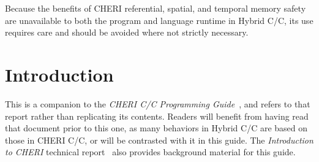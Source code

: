 \documentclass[12pt,twoside,openright,a4paper]{article}
\newcommand{\note}[2]{{\color{blue}[ Note: #1 - #2]}}
\renewcommand{\note}[2]{\relax\ifhmode\unskip\fi}
\newcommand{\rwnote}[1]{\note{#1}{Robert W.}}
\newcommand{\nwfnote}[1]{\note{#1}{nwf}}
\newcommand*{\cpp}{\texorpdfstring{C\textsmaller[2]{\protect\nolinebreak[4]\hspace{-.05em}\raisebox{.45ex}{\textbf{++}}}}{C++}}
\newcommand*{\COrCpp}{C/\cpp{}}
\newcommand*{\purecapCOrCpp}{CHERI \COrCpp{}}
\newcommand*{\hybridCOrCpp}{Hybrid \COrCpp{}}
\begin{document}
{\rwnote{I agree that I consider this a less compelling use case than a
  pure-capability runtime with integer heap offsets for per-language heaps.
  But there are other CHERI consumers who consider it highly desirable.}

\nwfnote{Do you want to call out partially adapted compartmentalized programs
(possibly inclusive of programs with their own runtime systems; one could
imagine enriching JS to have a ForeignCapability type, e.g.) as another
possible example where being able to exchange capabilities might be useful
despite possibly having a non-NULL DDC?}


Because the benefits of CHERI referential, spatial, and temporal memory safety are
unavailable to both the program and language runtime in \hybridCOrCpp{},
its use requires care and should be avoided where not strictly necessary.

}

\newcommand{\reviewwarning}{
\textbf{
As \hybridCOrCpp{} remains an area of active research and development, this
report is a request for review and comments rather than a specification.
}
\rwnote{This last sentence will go away in a final version.}
}

\begin{abstract}
\abstracttext

\reviewwarning
\end{abstract}

\newpage
\setcounter{tocdepth}{2}
\tableofcontents

\newpage

\section{Introduction}

%
%
\abstracttext

This is a companion to the \textit{\purecapCOrCpp{} Programming
Guide}~\cite{UCAM-CL-TR-947}, and refers to that report rather than
replicating its contents.
Readers will benefit from having read that document prior to this one, as
many behaviors in \hybridCOrCpp{} are based on those in \purecapCOrCpp{}, or
will be contrasted with it in this guide.
The \textit{Introduction to CHERI} technical
report~\cite{UCAM-CL-TR-941} also provides background material for this
guide.
\end{document}
